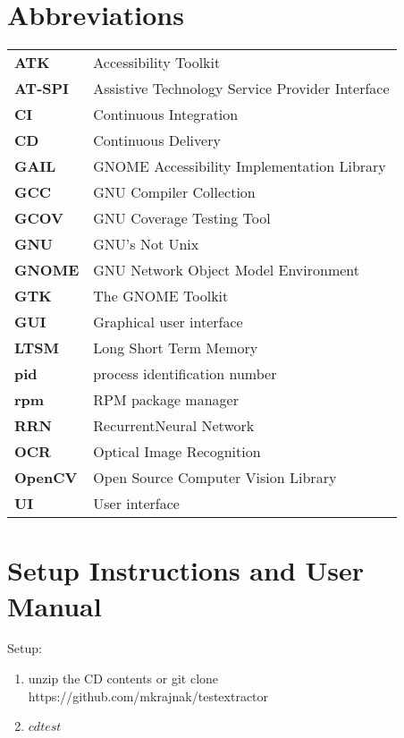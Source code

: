 
\chapter{Abbreviations}
\renewcommand{\arraystretch}{1.2}
\begin{tabular}{lp{12cm}}%
\textbf{ATK} & Accessibility Toolkit \\
\textbf{AT-SPI} & Assistive Technology Service Provider Interface \\
\textbf{CI} & Continuous Integration \\
\textbf{CD} & Continuous Delivery \\
\textbf{GAIL} & GNOME Accessibility Implementation Library \\
\textbf{GCC} & GNU Compiler Collection \\
\textbf{GCOV} & GNU Coverage Testing Tool \\
\textbf{GNU} & GNU's Not Unix \\
\textbf{GNOME} & GNU Network Object Model Environment \\
\textbf{GTK} & The GNOME Toolkit \\
\textbf{GUI} & Graphical user interface \\
\textbf{LTSM} & Long Short Term Memory \\
\textbf{pid} & process identification number \\
\textbf{rpm} & RPM package manager \\
\textbf{RRN} & RecurrentNeural Network \\
\textbf{OCR} & Optical Image Recognition \\
\textbf{OpenCV} & Open Source Computer Vision Library \\
\textbf{UI} & User interface \\
\end{tabular}

\chapter{Setup Instructions and User Manual}\label{manual}

Setup:

\begin{enumerate}
    \item unzip the CD contents or {git clone https://github.com/mkrajnak/testextractor}
    \item $ cd test$
\end{enumerate}

